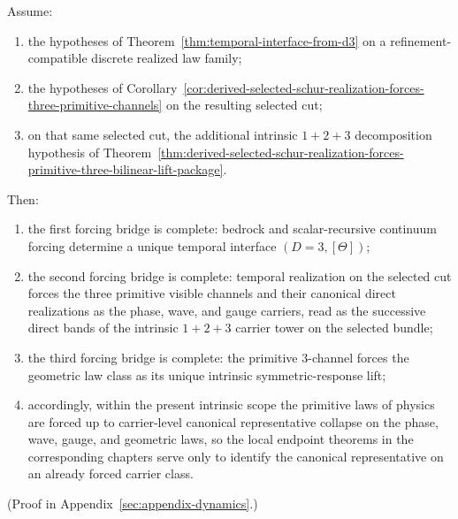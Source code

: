 \begin{theorem}
\label{thm:three-forcing-bridges-from-bedrock-to-primitive-physics}
Assume:
\begin{enumerate}[label=(\roman*), leftmargin=2em, itemsep=0.2em]
\item the hypotheses of
      Theorem~\ref{thm:temporal-interface-from-d3} on a
      refinement-compatible discrete realized law family;
\item the hypotheses of
      Corollary~\ref{cor:derived-selected-schur-realization-forces-three-primitive-channels}
      on the resulting selected cut;
\item on that same selected cut, the additional intrinsic \(1+2+3\)
      decomposition hypothesis of
      Theorem~\ref{thm:derived-selected-schur-realization-forces-primitive-three-bilinear-lift-package}.
\end{enumerate}
Then:
\begin{enumerate}[label=(\alph*), leftmargin=2em, itemsep=0.2em]
\item the first forcing bridge is complete: bedrock and scalar-recursive
      continuum forcing determine a unique temporal interface
      \((D=3,[\Theta])\);
\item the second forcing bridge is complete: temporal realization on the
      selected cut forces the three primitive visible channels and their
      canonical direct realizations as the phase, wave, and gauge carriers,
      read as the successive direct bands of the intrinsic \(1+2+3\) carrier
      tower on the selected bundle;
\item the third forcing bridge is complete: the primitive \(3\)-channel forces
      the geometric law class as its unique intrinsic symmetric-response lift;
\item accordingly, within the present intrinsic scope the primitive
      laws of physics are forced up to carrier-level canonical representative
      collapse on the phase, wave, gauge, and geometric laws, so the local
      endpoint theorems in the corresponding chapters serve only to identify the
      canonical representative on an already forced carrier class.
\end{enumerate}
\end{theorem}

(Proof in Appendix~\ref{sec:appendix-dynamics}.)

